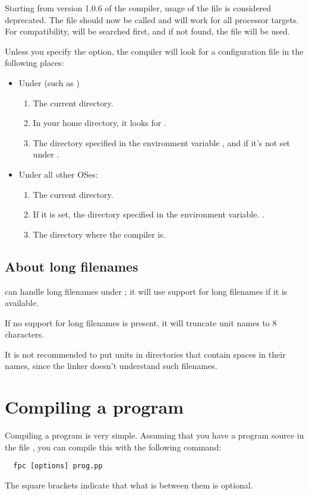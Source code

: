 Starting from version 1.0.6 of the compiler, usage of the
file  is considered deprecated. The file
should now be called  and will work for
all processor targets. For compatibility,  will
be searched first, and if not found, the file 
will be used.

Unless you specify the  option, the compiler will look
for a configuration file  in the following places:

\begin{itemize}
\item Under \unix (such as \linux)
\begin{enumerate}
\item The current directory.
\item In your home directory, it looks for .
\item The directory specified in the environment variable
, and if it's not set under .
\end{enumerate}
\item Under all other OSes:
\begin{enumerate}
\item The current directory.
\item If it is set, the directory specified in the environment variable.
.
\item The directory where the compiler is.
\end{enumerate}
\end{itemize}

\subsection{About long filenames}
\fpc can handle long filenames under \windows; it will use support for
long filenames if it is available.

If no support for long filenames is present, it will truncate unit names
to 8 characters.

It is not recommended to put units in directories that contain spaces in
their names, since the linker doesn't understand such filenames.

\section{Compiling a program}
Compiling a program is very simple. Assuming that you have a program source
in the file , you can compile this with the following command:
\begin{verbatim}
  fpc [options] prog.pp
\end{verbatim}
The square brackets \var{[\ ]} indicate that what is between them is optional.

